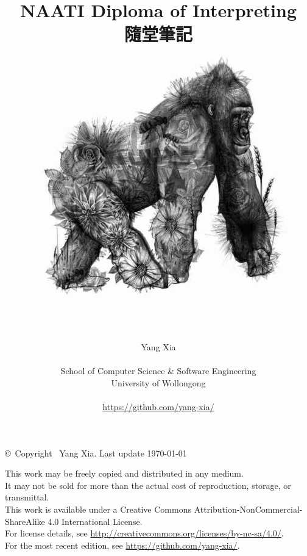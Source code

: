 \documentclass[12pt, oneside]{book}
\title{\textbf{NAATI Diploma of Interpreting}\\ 隨堂筆記 \\ \includegraphics[scale=0.6]{pics/cover}}
\author{\LARGE{Yang Xia}\\ \\ School of Computer Science \& Software Engineering \\ University of Wollongong \\ \\ \url{https://github.com/yang-xia/} \\}
\date{}
\newenvironment{bottompar}{\par\vspace*{\fill}}{\clearpage}
\begin{document}
\begin{titlepage}
\maketitle
\begingroup
\let\cleardoublepage\clearpage
\thispagestyle{empty}
\endgroup
\end{titlepage}

\newpage

\begin{bottompar}
\begin{center}
	\copyright\ Copyright \the\year\ Yang Xia. Last update {\ddmmyyyydate\today}
	
	This work may be freely copied and distributed in any medium.\\
	It may not be sold for more than the actual cost of reproduction, storage, or transmittal.\\
	This work is available under a Creative Commons Attribution-NonCommercial-ShareAlike 4.0 International License.\\
	For license details, see \url{http://creativecommons.org/licenses/by-nc-sa/4.0/}.\\
	For the most recent edition, see \url{https://github.com/yang-xia/}.
\end{center}
\end{bottompar}

\tableofcontents











\end{document}
